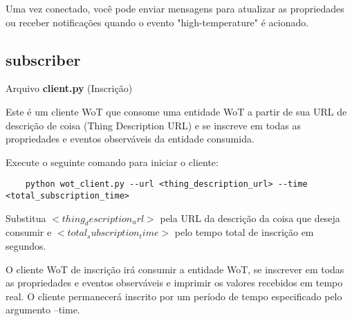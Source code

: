 Uma vez conectado, você pode enviar mensagens para atualizar as propriedades ou receber notificações quando o evento "high-temperature" é acionado. 

\subsection{subscriber}

Arquivo \textbf{client.py} (Inscrição)

Este é um cliente WoT que consome uma entidade WoT a partir de sua URL de descrição de coisa (Thing Description URL) e se inscreve em todas as propriedades e eventos observáveis da entidade consumida.

Execute o seguinte comando para iniciar o cliente:

\begin{verbatim}
    python wot_client.py --url <thing_description_url> --time <total_subscription_time>
\end{verbatim}

Substitua $<thing_description_url>$ pela URL da descrição da coisa que deseja consumir e $<total_subscription_time>$ pelo tempo total de inscrição em segundos.

O cliente WoT de inscrição irá consumir a entidade WoT, se inscrever em todas as propriedades e eventos observáveis e imprimir os valores recebidos em tempo real. O cliente permanecerá inscrito por um período de tempo especificado pelo argumento --time.
